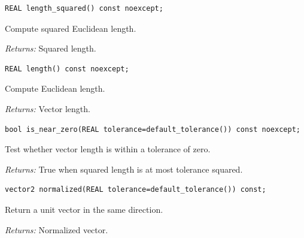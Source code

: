 \par\noindent\begin{minipage}{\linewidth}
\begin{lstlisting}[style=apireference]
REAL length_squared() const noexcept;
\end{lstlisting}
{\footnotesize Compute squared Euclidean length.\par}
{\footnotesize\textit{Returns:} Squared length.\par}
\end{minipage}\par\vspace{1pt}
\par\noindent\begin{minipage}{\linewidth}
\begin{lstlisting}[style=apireference]
REAL length() const noexcept;
\end{lstlisting}
{\footnotesize Compute Euclidean length.\par}
{\footnotesize\textit{Returns:} Vector length.\par}
\end{minipage}\par\vspace{1pt}
\par\noindent\begin{minipage}{\linewidth}
\begin{lstlisting}[style=apireference]
bool is_near_zero(REAL tolerance=default_tolerance()) const noexcept;
\end{lstlisting}
{\footnotesize Test whether vector length is within a tolerance of zero.\par}
{\footnotesize\textit{Returns:} True when squared length is at most tolerance squared.\par}
\end{minipage}\par\vspace{1pt}
\par\noindent\begin{minipage}{\linewidth}
\begin{lstlisting}[style=apireference]
vector2 normalized(REAL tolerance=default_tolerance()) const;
\end{lstlisting}
{\footnotesize Return a unit vector in the same direction.\par}
{\footnotesize\textit{Returns:} Normalized vector.\par}
\end{minipage}\par\vspace{1pt}
